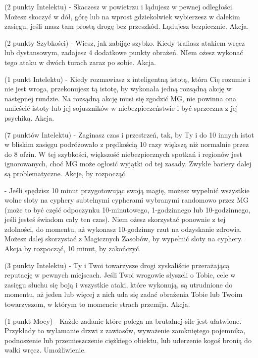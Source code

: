 { (2 punkty Intelektu) - Skaczesz w powietrzu i lądujesz w pewnej odległości. Możesz skoczyć w dół, górę lub na wprost gdziekolwiek wybierzesz w dalekim zasięgu, jeśli masz tam prostą drogę bez przeszkód. Lądujesz bezpiecznie. Akcja.

 (2 punkty Szybkości) - Wiesz, jak zabijąc szybko. Kiedy trafiasz atakiem wręcz lub dystansowym, zadajesz 4 dodatkowe punkty obrażeń. NIem ożesz wykonać tego ataku w dwóch turach zaraz po sobie. Akcja.

 (1 punkt Intelektu) - Kiedy rozmawiasz z inteligentną istotą, która Cię rozumie i nie jest wroga, przekonujesz tą istotę, by wykonała jedną rozsądną akcję w następnej rundzie. Na rozsądną akcję musi się zgodzić MG, nie powinna ona umieścić istoty lub jej sojuszników w niebezpieczeństwie i być sprzeczna z jej psychiką. Akcja.

 (7 punktów Intelektu) - Zaginasz czas i przestrzeń, tak, by Ty i do 10 innych istot w bliskim zasięgu podróżowało z prędkością 10 razy większą niż normalnie przez do 8 ofzin. W tej szybkości, większość niebezpiecznych spotkań i regionów jest ignorowanych, choć MG może ogłosić wyjątki od tej zasady. Zwykłe bariery dalej są problematyczne. Akcje, by rozpocząć.

 - Jeśli spędzisz 10 minut przygotowując swoją magię, możesz wypełnić wszystkie wolne sloty na cyphery subtelnymi cypherami wybranymi randomowo przez MG (może to być część odpoczynku 10-minutowego, 1-godzinnego lub 10-godzinnego, jeśli jesteś świadom cały ten czas). Niem ożesz skorzystać ponownie z tej zdolności, do momentu, aż wykonasz 10-godzinny rzut na odzyskanie zdrowia. Możesz dalej skorzystać z Magicznych Zasobów, by wypełnić sloty na cyphery. Akcja by rozpocząć, 10 minut, by zakończyć.

 (3 punkty Intelektu) - Ty i Twoi towarzysze drogi zyskaliście przerażającą reputację w pewnych miejscach. Jeśli Twoi wrogowie słyszeli o Tobie, cele w zasięgu słuchu się boją i wszystkie ataki, które wykonują, są utrudnione do momentu, aż jeden lub więcej z nich uda się zadać obrażenia Tobie lub Twoim towarzyszom, w którym to momencie strach przemija. Akcja.

 (1 punkt Mocy) - Każde zadanie które polega na brutalnej sile jest ułatwione. Przykłady to wyłamanie drzwi z zawiasów, wyważenie zamkniętego pojemnika, podnoszenie lub przemieszczenie ciężkiego obiektu, lub uderzenie kogoś bronią do walki wręcz. Umożliwienie.

}
